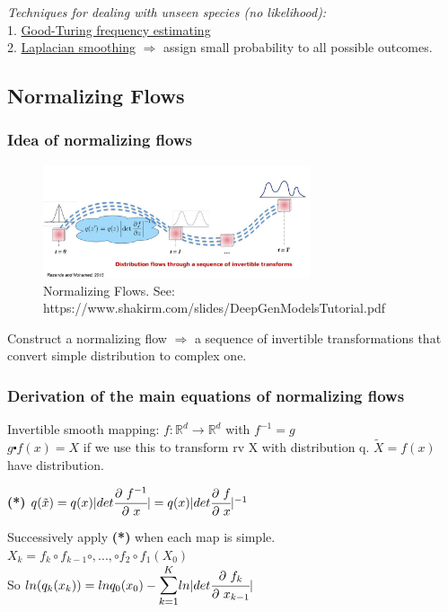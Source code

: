 \documentclass[12pt,a4paper]{article}
\begin{document}
\textit{Techniques for dealing with unseen species (no likelihood):}\\
1. \href{https://www.cs.cornell.edu/courses/cs6740/2010sp/guides/lec11.pdf}{Good-Turing frequency estimating}  \\
2. \href{https://towardsdatascience.com/laplace-smoothing-in-na%C3%AFve-bayes-algorithm-9c237a8bdece}{Laplacian smoothing} $\Rightarrow$ assign small probability to all possible outcomes. 


\subsection{Normalizing Flows}
\subsubsection{Idea of normalizing flows}
\begin{figure}[!ht]
    \centering
    \includegraphics[width=0.7\textwidth]{fig/norm_flow.jpg}
    \caption{Normalizing Flows. See: https://www.shakirm.com/slides/DeepGenModelsTutorial.pdf}
\end{figure}

Construct a normalizing flow $\Rightarrow$ a sequence of invertible transformations that convert simple distribution to complex one. 

\subsubsection{Derivation of the main equations of normalizing flows}
Invertible smooth mapping:
$f: \mathbb{R}^d\rightarrow \mathbb{R}^d$
with $f^{-1}=g$ \\
$g\centerdot f(x)=X$ if we use this to transform rv X with distribution q.
$\tilde{X}=f(x)$ have distribution. 

\textbf{(*)} $q(\tilde{x})=q(x)|det\cfrac{\partial\ f^{-1}}{\partial\ x}|=q(x)|det\cfrac{\partial\ f}{\partial\ x}|^{-1}$

Successively apply \textbf{(*)} when each map is simple. \\
$X_k=f_k \circ f_{k-1} \circ, ..., \circ f_2 \circ f_1 (X_0)$\\
So $ln(q_k(x_k))=ln q_0(x_0)-\bsum{k=1}{K}ln|det\pfrac{f_k}{x_{k-1}}|$
\end{document}
